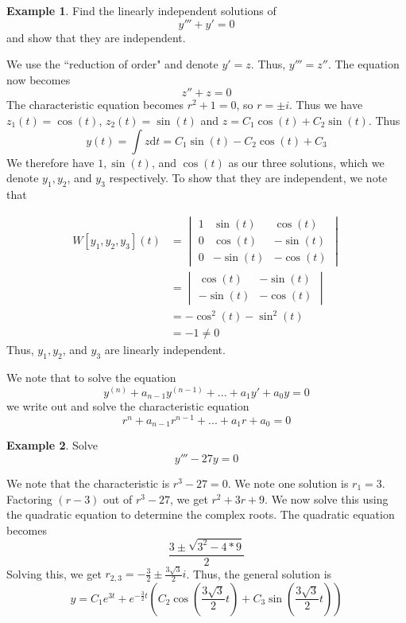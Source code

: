 \documentclass[11pt]{article}
\theoremstyle{plain} %
\theoremstyle{definition}
\theoremstyle{example}
\newtheorem*{example}{Example}
\theoremstyle{remark}
\begin{document}
\begin{example}
Find the linearly independent solutions of $$y''' + y' = 0$$ and show that they are independent.
\end{example}

We use the ``reduction of order" and denote $y' = z$. Thus, $y''' = z''$. The equation now becomes $$z'' + z = 0$$ The characteristic equation becomes $r^2+1=0$, so $r = \pm i$. Thus we have $z_1(t) = \cos(t)$, $z_2(t) = \sin(t)$ and $z = C_1\cos(t) + C_2\sin(t)$. Thus
$$y(t) = \int z\mathrm d t = C_1\sin(t) -C_2\cos(t) + C_3$$
We therefore have $1, \sin(t)$, and $\cos(t)$ as our three solutions, which we denote $y_1, y_2$, and $y_3$ respectively. To show that they are independent, we note that 

\begin{align*}
	W[y_1, y_2, y_3](t) &= \begin{vmatrix}1 & \sin(t) & \cos(t) \\ 0 & \cos(t) & -\sin(t) \\ 0 & -\sin(t) & -\cos(t)\end{vmatrix}\\
	&= \begin{vmatrix}\cos(t) &-\sin(t) \\ -\sin(t) & -\cos(t) \end{vmatrix}\\
	&= -\cos^2(t) -\sin^2(t) \\
	&= -1 \neq 0
\end{align*} 
Thus, $y_1, y_2$, and $y_3$ are linearly independent. 

We note that to solve the equation
$$y^{(n)}  + a_{n-1}y^{(n-1)} + ... + a_1y' + a_0y = 0$$
we write out and solve the characteristic equation 
$$r^n + a_{n-1}r^{n-1} + ... + a_1r + a_0 = 0$$

\begin{example}
Solve $$y''' -27y = 0$$
\end{example}

We note that the characteristic is $r^3 -27 = 0$. We note one solution is $r_1 = 3$. Factoring $(r-3)$ out of $r^3-27$, we get $r^2+3r+9$. We now solve this using the quadratic equation to determine the complex roots. The quadratic equation becomes $$\frac{3 \pm \sqrt{3^2 -4*9}}{2}$$
Solving this, we get $r_{2,3} = -\frac{3}{2} \pm \frac{3\sqrt{3}}{2}i$. Thus, the general solution is $$y = C_1e^{3t} +e^{-\frac{3}{2}t}\left(C_2\cos\left(\frac{3\sqrt{3}}{2}t\right) + C_3\sin\left(\frac{3\sqrt{3}}{2}t\right)\right)$$
\end{document}

